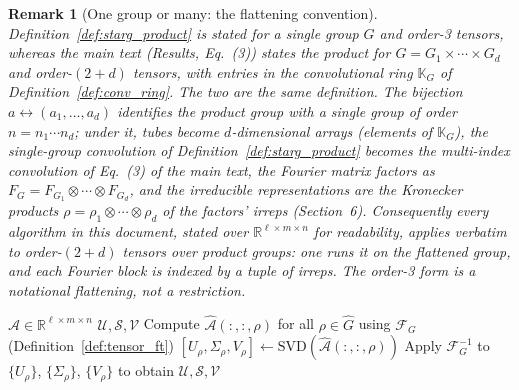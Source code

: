 \documentclass[10pt,a4paper]{amsart}
\newtheorem{remark}{Remark}
\newcommand{\bbR}{\mathbb{R}}
\newcommand{\calA}{\mathcal{A}}
\newcommand{\calS}{\mathcal{S}}
\newcommand{\calU}{\mathcal{U}}
\newcommand{\calV}{\mathcal{V}}
\newcommand{\starG}{\star_G}
\begin{document}
\begin{remark}[One group or many: the flattening convention]\label{rem:flatten}
Definition~\ref{def:starg_product} is stated for a single group $G$ and
order-3 tensors, whereas the main text (Results, Eq.~(3)) states the product
for $G = G_1 \times \cdots \times G_d$ and order-$(2+d)$ tensors, with entries
in the convolutional ring $\mathbb{K}_G$ of
Definition~\ref{def:conv_ring}. The two are the same definition. The bijection
$a \leftrightarrow (a_1, \ldots, a_d)$ identifies the product group with a
single group of order $n = n_1 \cdots n_d$; under it, tubes become
$d$-dimensional arrays (elements of $\mathbb{K}_G$), the single-group
convolution of Definition~\ref{def:starg_product} becomes the multi-index
convolution of Eq.~(3) of the main text, the Fourier matrix factors as
$F_G = F_{G_1} \otimes \cdots \otimes F_{G_d}$, and the irreducible
representations are the Kronecker products
$\rho = \rho_1 \otimes \cdots \otimes \rho_d$ of the factors' irreps
(Section~6). Consequently every algorithm in this document, stated over
$\bbR^{\ell \times m \times n}$ for readability, applies verbatim to
order-$(2+d)$ tensors over product groups: one runs it on the flattened
group, and each Fourier block is indexed by a tuple of irreps. The order-3
form is a notational flattening, not a restriction.
\end{remark}

\begin{algorithm}[h]
\caption{$\starG$-SVD}
\label{alg:svd}
\begin{algorithmic}[1]
\Require $\calA \in \bbR^{\ell \times m \times n}$ 
\Ensure $\calU, \calS, \calV$
\State Compute $\hat{\calA}(:,:,\rho)$ for all $\rho \in \hat{G}$ using $\mathcal{F}_G$ (Definition~\ref{def:tensor_ft})
    \State $[U_\rho, \Sigma_\rho, V_\rho] \gets \mathrm{SVD}(\hat{\calA}(:,:,\rho))$
\EndFor
\State Apply $\mathcal{F}_G^{-1}$ to $\{U_\rho\}$, $\{\Sigma_\rho\}$, $\{V_\rho\}$ to obtain $\calU, \calS, \calV$
\end{algorithmic}
\end{algorithm}
\end{document}
